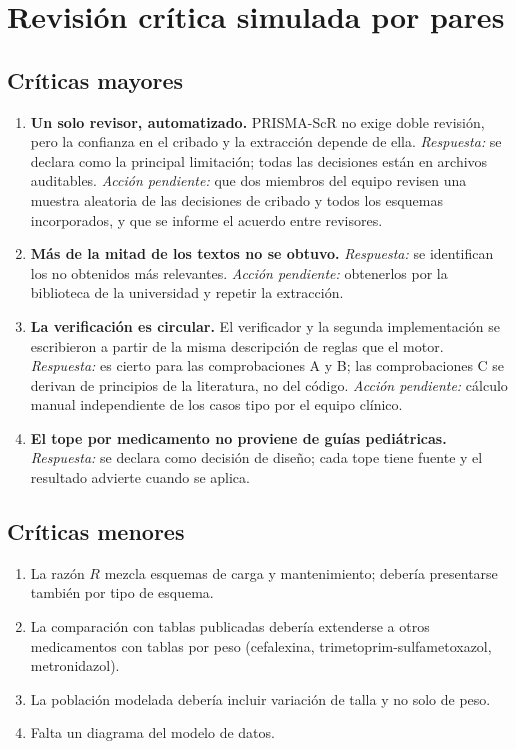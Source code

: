 \documentclass[11pt,a4paper]{article}
\begin{document}
\section{Revisión crítica simulada por pares}

\subsection*{Críticas mayores}
\begin{enumerate}
  \item \textbf{Un solo revisor, automatizado.} PRISMA-ScR no exige doble revisión, pero la confianza en el cribado y la extracción depende de ella. \emph{Respuesta:} se declara como la principal limitación; todas las decisiones están en archivos auditables. \emph{Acción pendiente:} que dos miembros del equipo revisen una muestra aleatoria de las decisiones de cribado y todos los esquemas incorporados, y que se informe el acuerdo entre revisores.
  \item \textbf{Más de la mitad de los textos no se obtuvo.} \emph{Respuesta:} se identifican los no obtenidos más relevantes. \emph{Acción pendiente:} obtenerlos por la biblioteca de la universidad y repetir la extracción.
  \item \textbf{La verificación es circular.} El verificador y la segunda implementación se escribieron a partir de la misma descripción de reglas que el motor. \emph{Respuesta:} es cierto para las comprobaciones A y B; las comprobaciones C se derivan de principios de la literatura, no del código. \emph{Acción pendiente:} cálculo manual independiente de los casos tipo por el equipo clínico.
  \item \textbf{El tope por medicamento no proviene de guías pediátricas.} \emph{Respuesta:} se declara como decisión de diseño; cada tope tiene fuente y el resultado advierte cuando se aplica.
\end{enumerate}

\subsection*{Críticas menores}
\begin{enumerate}
  \item La razón $R$ mezcla esquemas de carga y mantenimiento; debería presentarse también por tipo de esquema.
  \item La comparación con tablas publicadas debería extenderse a otros medicamentos con tablas por peso (cefalexina, trimetoprim-sulfametoxazol, metronidazol).
  \item La población modelada debería incluir variación de talla y no solo de peso.
  \item Falta un diagrama del modelo de datos.
\end{enumerate}
\end{document}
